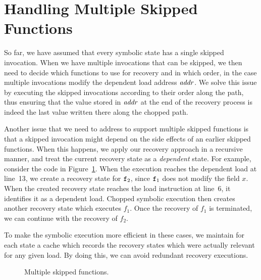 
\section{Handling Multiple Skipped Functions}
\label{Se:SkipMultipleFuncs}
So far, we have assumed that every symbolic state has a single skipped
invocation. When we have multiple invocations that can be skipped, we
then need to decide which functions to use for recovery and in which
order, in the case multiple invocations modify the dependent load
address $\mathit{addr}$. We solve this issue by executing the skipped
invocations according to their order along the path, thus ensuring
that the value stored in $\mathit{addr}$ at the end of the recovery process is
indeed the last value written there along the chopped path.

Another issue that we need to address to support multiple skipped
functions is that a skipped invocation might depend on the side
effects of an earlier skipped functions. When this happens, we apply
our recovery approach in a recursive manner, and treat the current
recovery state as a \emph{dependent} state. For example, consider the
code in Figure~\ref{fig:multiple-skipped-functions}. When the
execution reaches the dependent load at line~13, we create a recovery
state for $\texttt{f}_2$, since $\texttt{f}_1$ does not modify the field
$x$.  When the created recovery state reaches the load instruction at
line~6, it identifies it as a dependent load. Chopped symbolic
execution then creates another recovery state which executes $f_1$.
Once the recovery of $f_1$ is terminated, we can continue with the
recovery of $f_2$.

To make the symbolic execution more efficient in these cases, we
maintain for each state a cache which records the recovery states
which were actually relevant for any given load. By doing this, we can
avoid redundant recovery executions.

\begin{figure}[tbp]

\caption{Multiple skipped functions.}\vspace{-5mm}
\label{fig:multiple-skipped-functions}
\end{figure}


